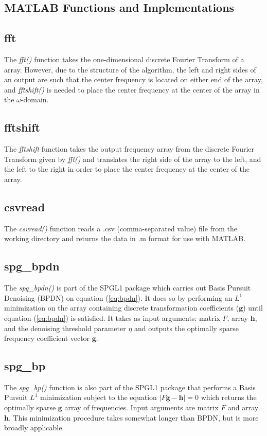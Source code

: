 \documentclass[11pt]{article}
\begin{document}
\begin{appendices}

\section{MATLAB Functions and Implementations}

\subsection*{fft}
The \emph{fft()} function takes the one-dimensional discrete Fourier Transform of a array.  However, due to the structure of the algorithm, the left and right sides of an output are such that the center frequency is located on either end of the array, and \emph{fftshift()} is needed to place the center frequency at the center of the array in the $\omega$-domain.

\subsection*{fftshift}
The \emph{fftshift} function takes the output frequency array from the discrete Fourier Transform given by \emph{fft()} and translates the right side of the array to the left, and the left to the right in order to place the center frequency at the center of the array.  

\subsection*{csvread}
The \emph{csvread()} function reads a .csv (comma-separated value) file from the working directory and returns the data in .m format for use with MATLAB.

\subsection*{spg\_bpdn}
The \emph{spg\_bpdn()} is part of the SPGL1 package which carries out Basis Pursuit Denoising (BPDN) on equation (\ref{eq:bpdn}). It does so by performing an $L^{1}$ minimization on the array containing discrete transformation coefficients ($\mathbf{g}$) until equation (\ref{eq:bpdn}) is satisfied. It takes as input arguments:  matrix $F$, array $\mathbf{h}$, and the denoising threshold parameter $\eta$ and outputs the optimally sparse frequency coefficient vector $\mathbf{g}$.

\subsection*{spg\_bp}
The \emph{spg\_bp()} function is also part of the SPGL1 package that performs a Basis Pursuit $L^{1}$ minimization subject to the equation $ | F \mathbf{g} - \mathbf{h} | = 0$ which returns the optimally sparse $\mathbf{g}$ array of frequencies.  Input arguments are matrix $F$ and array $\mathbf{h}$.  This minimization procedure takes somewhat longer than BPDN, but is more broadly applicable.  


\end{appendices}
\end{document}
